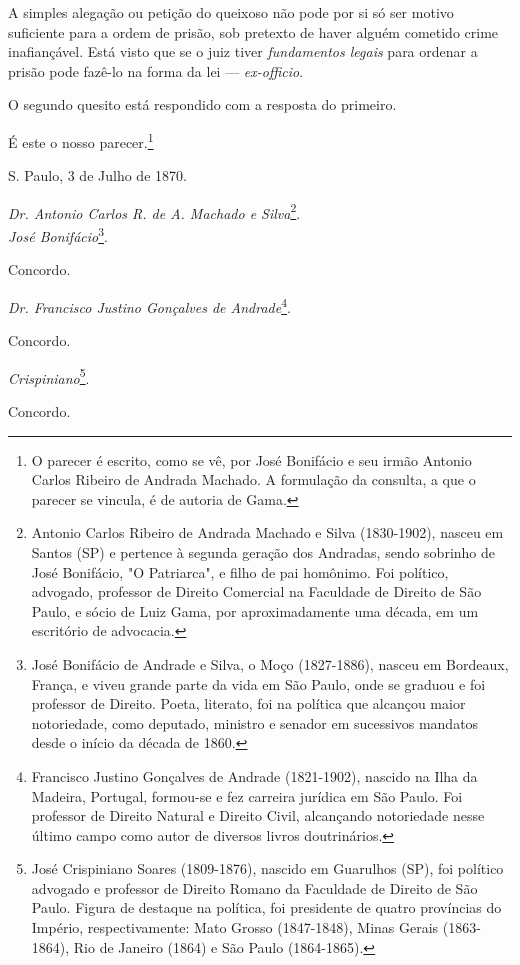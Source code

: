 A simples alegação ou petição do queixoso não pode por si só ser motivo
suficiente para a ordem de prisão, sob pretexto de haver alguém cometido
crime inafiançável. Está visto que se o juiz tiver \emph{fundamentos
legais} para ordenar a prisão pode fazê-lo na forma da lei ---
\emph{ex-officio}.

O segundo quesito está respondido com a resposta do primeiro.

É este o nosso parecer.\footnote{O parecer é escrito, como se vê, por
  José Bonifácio e seu irmão Antonio Carlos Ribeiro de Andrada Machado.
  A formulação da consulta, a que o parecer se vincula, é de autoria de
  Gama.}

S. Paulo, 3 de Julho de 1870.

\emph{Dr. Antonio Carlos R. de A. Machado e Silva}\footnote{Antonio
  Carlos Ribeiro de Andrada Machado e Silva (1830-1902), nasceu em
  Santos (SP) e pertence à segunda geração dos Andradas, sendo sobrinho
  de José Bonifácio, "O Patriarca", e filho de pai homônimo. Foi
  político, advogado, professor de Direito Comercial na Faculdade de
  Direito de São Paulo, e sócio de Luiz Gama, por aproximadamente uma
  década, em um escritório de advocacia.}.\\
\emph{José Bonifácio}\footnote{José Bonifácio de Andrade e Silva, o
  Moço (1827-1886), nasceu em Bordeaux, França, e viveu grande parte da
  vida em São Paulo, onde se graduou e foi professor de Direito. Poeta,
  literato, foi na política que alcançou maior notoriedade, como
  deputado, ministro e senador em sucessivos mandatos desde o início da
  década de 1860.}.

Concordo.

\emph{Dr. Francisco Justino Gonçalves de Andrade}\footnote{Francisco
  Justino Gonçalves de Andrade (1821-1902), nascido na Ilha da Madeira,
  Portugal, formou-se e fez carreira jurídica em São Paulo. Foi
  professor de Direito Natural e Direito Civil, alcançando notoriedade
  nesse último campo como autor de diversos livros doutrinários.}.

Concordo.

\emph{Crispiniano}\footnote{José Crispiniano Soares (1809-1876),
  nascido em Guarulhos (SP), foi político advogado e professor de
  Direito Romano da Faculdade de Direito de São Paulo. Figura de
  destaque na política, foi presidente de quatro províncias do Império,
  respectivamente: Mato Grosso (1847-1848), Minas Gerais (1863-1864),
  Rio de Janeiro (1864) e São Paulo (1864-1865).}.

Concordo.

